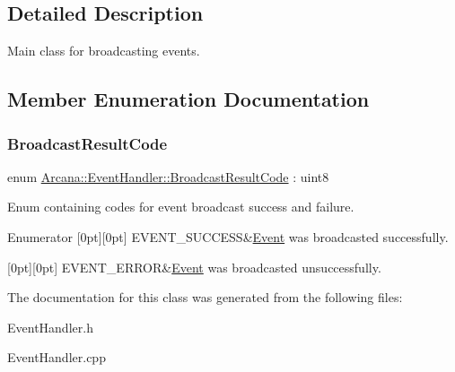 \subsection{Detailed Description}
Main class for broadcasting events. 



\subsection{Member Enumeration Documentation}
\mbox{\label{class_arcana_1_1_event_handler_a1763837e7c9732fff7df0d4e48b3dbd4}} 
\subsubsection{\texorpdfstring{Broadcast\+Result\+Code}{BroadcastResultCode}}
{\footnotesize\ttfamily enum \mbox{\hyperlink{class_arcana_1_1_event_handler_a1763837e7c9732fff7df0d4e48b3dbd4}{Arcana\+::\+Event\+Handler\+::\+Broadcast\+Result\+Code}} \+: uint8}



Enum containing codes for event broadcast success and failure. 

\begin{DoxyEnumFields}{Enumerator}
[0pt][0pt]{}\mbox{\label{class_arcana_1_1_event_handler_a1763837e7c9732fff7df0d4e48b3dbd4a8ea45dcfe2dfc827ecf65d103e18787c}} 
E\+V\+E\+N\+T\+\_\+\+S\+U\+C\+C\+E\+SS&\mbox{\hyperlink{class_arcana_1_1_event}{Event}} was broadcasted successfully. \\
\hline

[0pt][0pt]{}\mbox{\label{class_arcana_1_1_event_handler_a1763837e7c9732fff7df0d4e48b3dbd4a27766aae597f40890345c45fc59dd7f0}} 
E\+V\+E\+N\+T\+\_\+\+E\+R\+R\+OR&\mbox{\hyperlink{class_arcana_1_1_event}{Event}} was broadcasted unsuccessfully. \\
\hline

\end{DoxyEnumFields}


The documentation for this class was generated from the following files\+:\begin{DoxyCompactItemize}
\item 
Event\+Handler.\+h\item 
Event\+Handler.\+cpp\end{DoxyCompactItemize}

